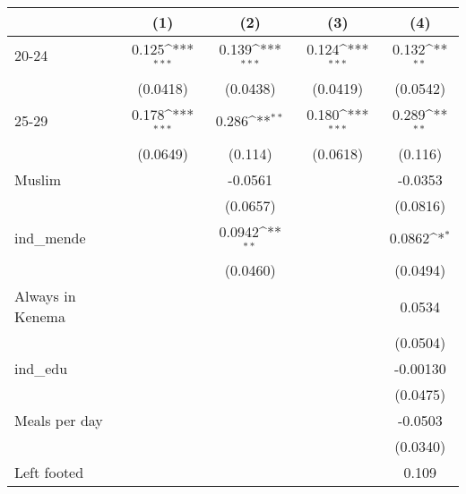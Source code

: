 {
\def\sym#1{\ifmmode^{#1}\else\(^{#1}\)\fi}
\begin{tabular}{l*{4}{c}}
\hline\hline
                    &\multicolumn{1}{c}{(1)}         &\multicolumn{1}{c}{(2)}         &\multicolumn{1}{c}{(3)}         &\multicolumn{1}{c}{(4)}         \\
\hline
20-24               &       0.125\sym{***}&       0.139\sym{***}&       0.124\sym{***}&       0.132\sym{**} \\
                    &    (0.0418)         &    (0.0438)         &    (0.0419)         &    (0.0542)         \\
[1em]
25-29               &       0.178\sym{***}&       0.286\sym{**} &       0.180\sym{***}&       0.289\sym{**} \\
                    &    (0.0649)         &     (0.114)         &    (0.0618)         &     (0.116)         \\
[1em]
Muslim              &                     &     -0.0561         &                     &     -0.0353         \\
                    &                     &    (0.0657)         &                     &    (0.0816)         \\
[1em]
ind\_mende           &                     &      0.0942\sym{**} &                     &      0.0862\sym{*}  \\
                    &                     &    (0.0460)         &                     &    (0.0494)         \\
[1em]
Always in Kenema    &                     &                     &                     &      0.0534         \\
                    &                     &                     &                     &    (0.0504)         \\
[1em]
ind\_edu             &                     &                     &                     &    -0.00130         \\
                    &                     &                     &                     &    (0.0475)         \\
[1em]
Meals per day       &                     &                     &                     &     -0.0503         \\
                    &                     &                     &                     &    (0.0340)         \\
[1em]
Left footed         &                     &                     &                     &       0.109         \\

\end{tabular}}
